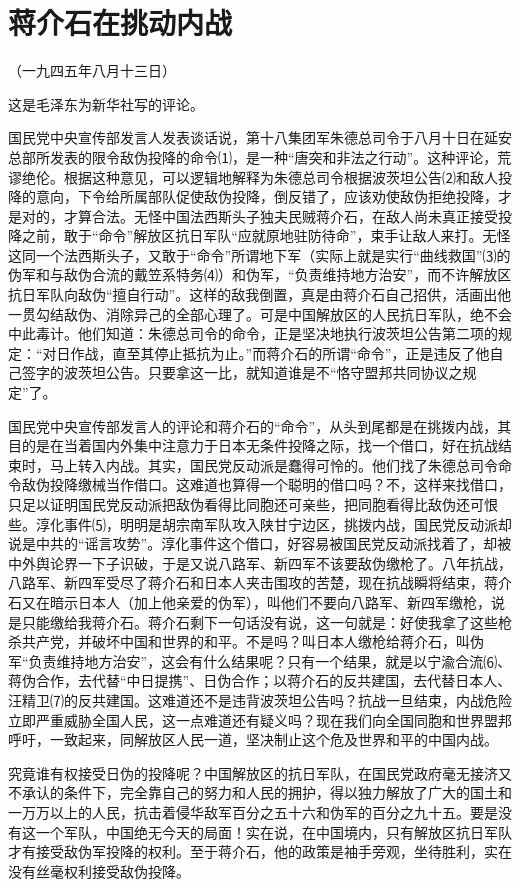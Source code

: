 \documentclass[UTF-8, a5paper, 12pt]{ctexart}
\begin{document}
\section{蒋介石在挑动内战}    

（一九四五年八月十三日）

这是毛泽东为新华社写的评论。

国民党中央宣传部发言人发表谈话说，第十八集团军朱德总司令于八月十日在延安总部所发表的限令敌伪投降的命令⑴，是一种“唐突和非法之行动”。这种评论，荒谬绝伦。根据这种意见，可以逻辑地解释为朱德总司令根据波茨坦公告⑵和敌人投降的意向，下令给所属部队促使敌伪投降，倒反错了，应该劝使敌伪拒绝投降，才是对的，才算合法。无怪中国法西斯头子独夫民贼蒋介石，在敌人尚未真正接受投降之前，敢于“命令”解放区抗日军队“应就原地驻防待命”，束手让敌人来打。无怪这同一个法西斯头子，又敢于“命令”所谓地下军（实际上就是实行“曲线救国”⑶的伪军和与敌伪合流的戴笠系特务⑷）和伪军，“负责维持地方治安”，而不许解放区抗日军队向敌伪“擅自行动”。这样的敌我倒置，真是由蒋介石自己招供，活画出他一贯勾结敌伪、消除异己的全部心理了。可是中国解放区的人民抗日军队，绝不会中此毒计。他们知道：朱德总司令的命令，正是坚决地执行波茨坦公告第二项的规定：“对日作战，直至其停止抵抗为止。”而蒋介石的所谓“命令”，正是违反了他自己签字的波茨坦公告。只要拿这一比，就知道谁是不“恪守盟邦共同协议之规定”了。

国民党中央宣传部发言人的评论和蒋介石的“命令”，从头到尾都是在挑拨内战，其目的是在当着国内外集中注意力于日本无条件投降之际，找一个借口，好在抗战结束时，马上转入内战。其实，国民党反动派是蠢得可怜的。他们找了朱德总司令命令敌伪投降缴械当作借口。这难道也算得一个聪明的借口吗？不，这样来找借口，只足以证明国民党反动派把敌伪看得比同胞还可亲些，把同胞看得比敌伪还可恨些。淳化事件⑸，明明是胡宗南军队攻入陕甘宁边区，挑拨内战，国民党反动派却说是中共的“谣言攻势”。淳化事件这个借口，好容易被国民党反动派找着了，却被中外舆论界一下子识破，于是又说八路军、新四军不该要敌伪缴枪了。八年抗战，八路军、新四军受尽了蒋介石和日本人夹击围攻的苦楚，现在抗战瞬将结束，蒋介石又在暗示日本人（加上他亲爱的伪军），叫他们不要向八路军、新四军缴枪，说是只能缴给我蒋介石。蒋介石剩下一句话没有说，这一句就是：好使我拿了这些枪杀共产党，并破坏中国和世界的和平。不是吗？叫日本人缴枪给蒋介石，叫伪军“负责维持地方治安”，这会有什么结果呢？只有一个结果，就是以宁渝合流⑹、蒋伪合作，去代替“中日提携”、日伪合作；以蒋介石的反共建国，去代替日本人、汪精卫⑺的反共建国。这难道还不是违背波茨坦公告吗？抗战一旦结束，内战危险立即严重威胁全国人民，这一点难道还有疑义吗？现在我们向全国同胞和世界盟邦呼吁，一致起来，同解放区人民一道，坚决制止这个危及世界和平的中国内战。

究竟谁有权接受日伪的投降呢？中国解放区的抗日军队，在国民党政府毫无接济又不承认的条件下，完全靠自己的努力和人民的拥护，得以独力解放了广大的国土和一万万以上的人民，抗击着侵华敌军百分之五十六和伪军的百分之九十五。要是没有这一个军队，中国绝无今天的局面！实在说，在中国境内，只有解放区抗日军队才有接受敌伪军投降的权利。至于蒋介石，他的政策是袖手旁观，坐待胜利，实在没有丝毫权利接受敌伪投降。
\end{document}
